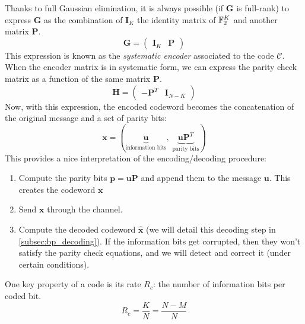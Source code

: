 Thanks to full Gaussian elimination, it is always possible (if $\bm{G}$ is
full-rank) to express $\bm{G}$ as the combination of $\bm{I}_K$ the identity
matrix of $\mathbb{F}_2^K$ and another matrix $\bm{P}$.
\begin{equation}
    \bm{G} =
    \begin{pmatrix}
        \bm{I}_K & \bm{P}
    \end{pmatrix}
\end{equation}
This expression is known as the \textit{systematic encoder} associated to the
code $\mathcal{C}$. When the encoder matrix is in systematic form, we
can express the parity check matrix as a function of the same matrix $\bm{P}$.
\begin{equation}
    \bm{H} =
    \begin{pmatrix}
        - \bm{P}^T & \bm{I}_{N-K}
    \end{pmatrix}
\end{equation}
Now, with this expression, the encoded codeword becomes the
concatenation of the original message and a set of parity bits:
\begin{equation}
    \bm{x} = (
    \underbrace{\bm{u}}_\text{information bits} ,\;
    \underbrace{\bm{u} \bm{P}^T}_\text{parity bits}
    )
\end{equation}
This provides a nice interpretation of the encoding/decoding procedure:
\begin{enumerate}
    \item Compute the parity bits $\bm{p} = \bm{u} \bm{P}$ and append them
          to the message $\bm{u}$. This creates the codeword $\bm{x}$
    \item Send $\bm{x}$ through the channel.
    \item Compute the decoded codeword $\widehat{\bm{x}}$ (we will detail this
          decoding step in \autoref{subsec:bp_decoding}). If the information
          bits get corrupted, then they won't satisfy the parity check
          equations, and we will detect and correct it (under certain
          conditions).
\end{enumerate}

One key property of a code is its rate $R_c$: the number of information bits per
coded bit.
\begin{equation}
    R_c = \frac{K}{N} = \frac{N - M}{N}
\end{equation}


